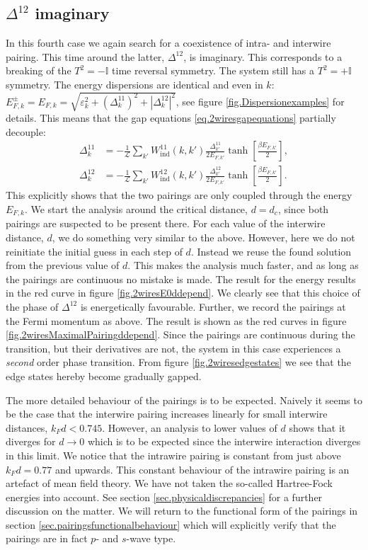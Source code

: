 \subsection{\texorpdfstring{$\Delta^{12}$}{Interwire pairing} imaginary}
In this fourth case we again search for a coexistence of intra- and interwire pairing. This time around the latter, $\Delta^{12}$, is imaginary. This corresponds to a breaking of the $T^2 = -\mathbb{I}$ time reversal symmetry. The system still has a $T^2 = + \mathbb{I}$ symmetry. The energy dispersions are identical and even in $k$: $E^{\pm}_{F,k} = E_{F,k} = \sqrt{\varepsilon_k^2 + (\Delta^{11}_k)^2 + |\Delta^{12}_k|^2}$, see figure \ref{fig.Dispersionexamples} for details. This means that the gap equations \eqref{eq.2wiresgapequations} partially decouple: 
\begin{align}
\Delta^{11}_k &= -\frac{1}{\mathcal{L}}\sum_{k'} W_{\text{ind}}^{11}(k, k')\frac{\Delta^{11}_{k'}}{2E_{F,k'}}\tanh\left[\frac{\beta E_{F,k'}}{2}\right], \nonumber \\
\Delta^{12}_k &= -\frac{1}{\mathcal{L}}\sum_{k'} W_{\text{ind}}^{12}(k, k')\frac{\Delta^{12}_{k'}}{2E_{F,k'}}\tanh\left[\frac{\beta E_{F,k'}}{2}\right].
\label{eq.2wiresgapequationsDelta12imaginary}
\end{align} 
This explicitly shows that the two pairings are only coupled through the energy $E_{F,k}$. We start the analysis around the critical distance, $d = d_c$, since both pairings are suspected to be present there. For each value of the interwire distance, $d$, we do something very similar to the above. However, here we do not reinitiate the initial guess in each step of $d$. Instead we reuse the found solution from the previous value of $d$. This makes the analysis much faster, and as long as the pairings are continuous no mistake is made. The result for the energy results in the red curve in figure \ref{fig.2wiresE0ddepend}. We clearly see that this choice of the phase of $\Delta^{12}$ is energetically favourable. Further, we record the pairings at the Fermi momentum as above. The result is shown as the red curves in figure \ref{fig.2wiresMaximalPairingddepend}. Since the pairings are continuous during the transition, but their derivatives are not, the system in this case experiences a \textit{second} order phase transition. From figure \ref{fig.2wiresedgestates} we see that the edge states hereby become gradually gapped. 

The more detailed behaviour of the pairings is to be expected. Naively it seems to be the case that the interwire pairing increases linearly for small interwire distances, $k_Fd < 0.745$. However, an analysis to lower values of $d$ shows that it diverges for $d \to 0$ which is to be expected since the interwire interaction diverges in this limit. We notice that the intrawire pairing is constant from just above $k_Fd = 0.77$ and upwards. This constant behaviour of the intrawire pairing is an artefact of mean field theory. We have not taken the so-called Hartree-Fock energies into account. See section \ref{sec.physicaldiscrepancies} for a further discussion on the matter. We will return to the functional form of the pairings in section \ref{sec.pairingsfunctionalbehaviour} which will explicitly verify that the pairings are in fact $p$- and $s$-wave type.  


